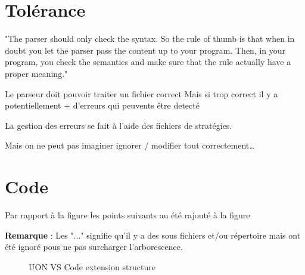 \documentclass[
    iict, %
    il, %
]{heig-tb}
\begin{document}
\section{Tolérance}

"The parser should only check the syntax. So the rule of thumb is that when in doubt you 
let the parser pass the content up to your program. Then, in your program, you check the semantics and make sure that the rule actually have a proper meaning."


Le parseur doit pouvoir traiter un fichier correct
Mais si trop correct il y a potentiellement + d'erreurs qui peuvents être detecté

La gestion des erreurs se fait à l'aide des fichiers de stratégies.

Mais on ne peut pas imaginer ignorer / modifier tout correctement\dots


\section{Code}


Par rapport à la figure %
les points suivants au été rajouté à la figure %

\textbf{Remarque} : Les "..." signifie qu'il y a des sous fichiers et/ou répertoire mais ont été ignoré pous ne pas surcharger
l'arborescence.

\begin{figure}[!h]
    \centering
    \caption{UON VS Code extension structure}
\end{figure}
\end{document}
